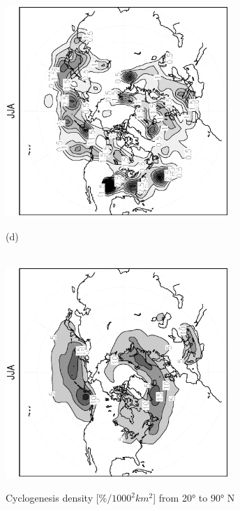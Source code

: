 \documentclass[12pt,a4paper,twoside,openright,headinclude,liststotoc,bibtotoc]{scrreprt}
\begin{document}
\begin{appendix}
\begin{figure}[b]
{\includegraphics[height=8.0cm,angle=-90]
{eps/cyclgen_PLASIM_T21_45JJA.eps}
}
\parbox{8.5cm}{\hspace{0.95cm}\begin{scriptsize}(d)\end{scriptsize} \vspace{-0.5cm} \\
\includegraphics[height=8.0cm,angle=-90]
{eps/cycldensity_ERA40_T21_45JJA.eps}
}
\caption[Cyclogenesis density Northern Hemisphere]{Cyclogenesis density [$\%/1000^2 km^2$] from 20° to 90° N}
\label{img:NHyclgen}
\end{figure}



\end{appendix}
\end{document}
